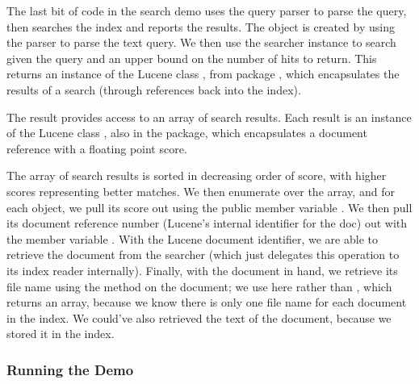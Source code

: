 The last bit of code in the search demo uses the query parser to parse
the query, then searches the index and reports the results.
%
%
The  object is created by using the parser to parse the
text query.  We then use the searcher instance to search given the
query and an upper bound on the number of hits to return.  This
returns an instance of the Lucene class , from package
, which encapsulates the results of a search (through
references back into the index).

The  result provides access to an array of search
results.  Each result is an instance of the Lucene class
, also in the  package, which
encapsulates a document reference with a floating point score.

The array of search results is sorted in decreasing order of score,
with higher scores representing better matches.  We then enumerate
over the array, and for each  object, we pull its score
out using the public member variable .  We then pull its
document reference number (Lucene's internal identifier for the doc)
out with the member variable .  With the Lucene document
identifier, we are able to retrieve the document from the searcher
(which just delegates this operation to its index reader internally).
Finally, with the document in hand, we retrieve its file name using
the  method on the document; we use  here
rather than , which returns an array, because we
know there is only one file name for each document in the index.  We
could've also retrieved the text of the document, because we stored it
in the index.

\subsubsection{Running the Demo}

